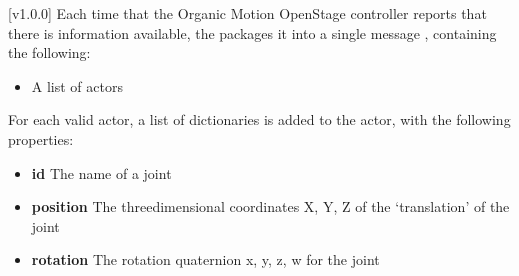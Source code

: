 [v1.0.0]
Each time that the Organic Motion OpenStage controller reports that there is information
available, the  packages it into a single message
\openSq{}\closeSq, containing the following:
\begin{itemize}
\item A list of actors
\end{itemize}

For each valid actor, a list of dictionaries is added to the actor, with the following
properties:
\begin{itemize}
\item\textbf{id} The name of a joint
\item\exSp\textbf{position} The three\longDash{}dimensional coordinates \openSq{}X, Y,
Z\closeSq{} of the `translation' of the joint
\item\exSp\textbf{rotation} The rotation quaternion \openSq{}x, y, z, w\closeSq{} for the
joint
\end{itemize}
\appendixEnd{}
